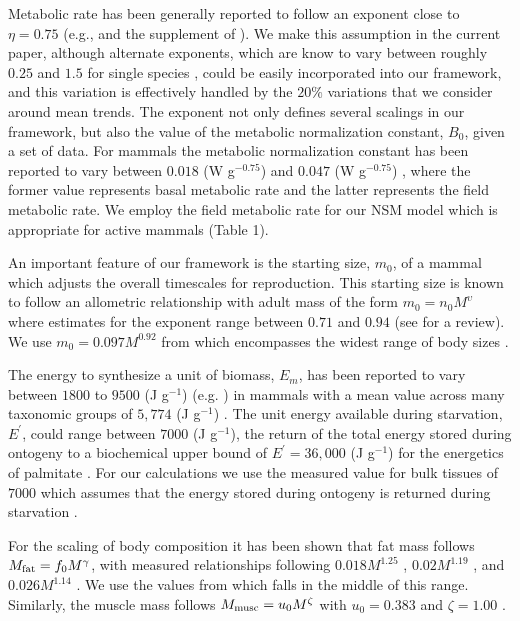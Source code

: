 \documentclass{pnastwo}
\begin{document}
\begin{article}
Metabolic rate has been generally reported to follow an exponent close to $\eta=0.75$ (e.g., \cite{West:2001bv,moses2008rmo} and the supplement of \cite{hou}). We make this assumption in the current paper, although alternate exponents, which are know to vary between roughly $0.25$ and $1.5$ for single species \cite{moses2008rmo}, could be easily incorporated into our framework, and this variation is effectively handled by the $20\%$ variations that we consider around mean trends. The exponent not only defines several scalings in our framework, but also the value of the metabolic normalization constant, $B_{0}$, given a set of data.  For mammals the metabolic normalization constant has been reported to vary between $0.018$ (W g$^{-0.75}$) and $0.047$ (W g$^{-0.75}$) \cite{hou,West:2001bv}, where the former value represents basal metabolic rate and the latter represents the field metabolic rate. We employ the field metabolic rate for our NSM model which is appropriate for active mammals (Table 1).

An important feature of our framework is the starting size, $m_{0}$, of a mammal which adjusts the overall timescales for reproduction. This starting size is known to follow an allometric relationship with adult mass of the form $m_{0}=n_{0}M^{\upsilon}$ where estimates for the exponent range between $0.71$ and $0.94$ (see \cite{peters1986ecological} for a review). We use $m_{0}=0.097M^{0.92}$ from \cite{blueweiss1978relationships} which encompasses the widest range of body sizes \cite{peters1986ecological}.

The energy to synthesize a unit of biomass, $E_{m}$, has been reported to vary between $1800$ to $9500$ (J g$^{-1}$) (e.g. \cite{West:2001bv,moses2008rmo,hou}) in mammals with a mean value across many taxonomic groups of $5,774$ (J g$^{-1}$) \cite{moses2008rmo}. The unit energy available during starvation, $E^{\prime}$, could range between $7000$ (J g$^{-1}$), the return of the total energy stored during ontogeny \cite{hou} to a biochemical upper bound of $E^{\prime}=36,000$ (J g$^{-1}$) for the energetics of palmitate \cite{stryer,hou}. For our calculations we use the measured value for bulk tissues of $7000$ which assumes that the energy stored during ontogeny is returned during starvation \cite{hou}.

For the scaling of body composition it has been shown that fat mass follows $M_{\rm fat}=f_{0}M^{\gamma}$, with measured  relationships following  $0.018M^{1.25}$ \cite{Dunbrack:1993ec}, $0.02M^{1.19}$ \cite{Lindstedt:1985hm}, and $0.026M^{1.14}$ \cite{Lindstedt:2002td}. We use the values from \cite{Lindstedt:1985hm} which falls in the middle of this range. Similarly, the muscle mass follows $M_{\rm musc}=u_{0}M^{\zeta}$ with $u_{0}=0.383$ and $\zeta=1.00$ \cite{Lindstedt:2002td}.


\end{article}
\end{document}

